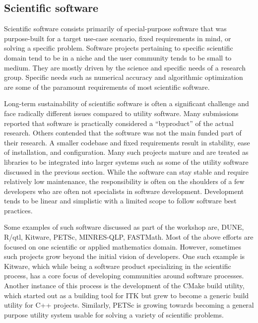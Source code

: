 \documentclass[11pt, oneside]{amsart}
\newcommand{\toolname}[1] {\textsf{#1}}
\begin{document}
\subsection{Scientific software}
Scientific software consists primarily of special-purpose software
that was purpose-built for a target use-case scenario, fixed 
requirements in mind, or solving a specific problem. Software projects
pertaining to specific scientific domain tend to be in a niche and the
user community tends to be small to medium. They are mostly driven by
the science and specific needs of a research group. Specific needs
such as numerical accuracy and algorithmic optimization are some of
the paramount requirements of most scientific software.

Long-term sustainability of scientific software is often a significant
challenge and face radically different issues compared to utility
software.  Many submissions reported that software is practically
considered a ``byproduct'' of the actual research. Others contended
that the software was not the main funded part of their research. A
smaller codebase and fixed requirements result in stability, ease of
installation, and configuration. Many such projects mature and are
treated as libraries to be integrated into larger systems such as some of
the utility software discussed in the previous section. While the
software can stay stable and require relatively low maintenance, the
responsibility is often on the shoulders of a few developers who
are often not specialists in software development. Development tends to
be linear and simplistic with a limited scope to follow software best
practices.

Some examples of such software discussed as part of the workshop are,
\toolname{DUNE}, \toolname{R/qtl}, \toolname{Kitware},
\toolname{PETSc}, \toolname{MINRES-QLP}, \toolname{FASTMath}.  Most of
the above efforts are focused on one scientific or applied
mathematics domain. However, sometimes such projects grow beyond the
initial vision of developers. One such example is \toolname{Kitware},
which while being a software product specializing in the scientific
process, has a core focus of developing communities around software
processes. Another instance of this process is the development of the
\toolname{CMake} build utility, which started out as a building tool
for \toolname{ITK} but grew to become a generic build utility for C++
projects. Similarly, \toolname{PETSc} is growing towards becoming a
general purpose utility system usable for solving a variety of
scientific problems.
\end{document}

